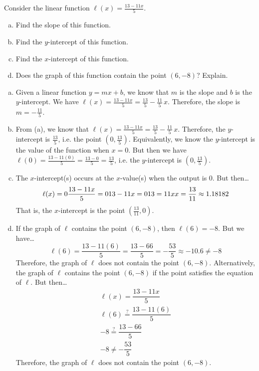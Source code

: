 \documentclass[11pt,letterpaper]{article}
\begin{document}

 Consider the linear function $\ell(x)= \frac{13 - 11x}{5}$. 
	\begin{enumerate}[(a)]
	\item Find the slope of this function.
	\item Find the $y$-intercept of this function.
	\item Find the $x$-intercept of this function.
	\item Does the graph of this function contain the point $(6, -8)$? Explain. 
	\end{enumerate} \pspace

\sol 
\begin{enumerate}[(a)]
\item Given a linear function $y= mx + b$, we know that $m$ is the slope and $b$ is the $y$-intercept. We have $\ell(x)= \frac{13 - 11x}{5}= \frac{13}{5} - \frac{11}{5}\,x$. Therefore, the slope is $m= -\frac{11}{5}$. 

\item From (a), we know that $\ell(x)= \frac{13 - 11x}{5}= \frac{13}{5} - \frac{11}{5}\,x$. Therefore, the $y$-intercept is $\frac{13}{5}$, i.e. the point $(0, \frac{13}{5})$. Equivalently, we know the $y$-intercept is the value of the function when $x= 0$. But then we have $\ell(0)= \frac{13 - 11(0)}{5}= \frac{13 - 0}{5}= \frac{13}{5}$, i.e. the $y$-intercept is $(0, \frac{13}{5})$. \pspace

\item The $x$-intercept(s) occurs at the $x$-value(s) when the output is 0. But then\dots
	\[
	\ell(x)= 0 
	\frac{13 - 11x}{5}= 0 \\
	13 - 11x= 0 \\
	13= 11x \\
	x= \frac{13}{11} \approx 1.18182
	\]
That is, the $x$-intercept is the point $(\frac{13}{11}, 0)$. \pspace

\item If the graph of $\ell$ contains the point $(6, -8)$, then $\ell(6)= -8$. But we have\dots
	\[
	\ell(6)= \dfrac{13 - 11(6)}{5}= \dfrac{13 - 66}{5}= -\dfrac{53}{5} \approx -10.6 \neq -8
	\]
Therefore, the graph of $\ell$ does not contain the point $(6, -8)$. Alternatively, the graph of $\ell$ contains the point $(6, -8)$ if the point satisfies the equation of $\ell$. But then\dots
	\[
	\begin{gathered}
	\ell(x)= \dfrac{13 - 11x}{5} \\
	\ell(6) \stackrel{?}{=} \dfrac{13 - 11(6)}{5} \\
	-8 \stackrel{?}{=} \dfrac{13 - 66}{5} \\
	-8 \neq -\dfrac{53}{5}
	\end{gathered}
	\]
Therefore, the graph of $\ell$ does not contain the point $(6, -8)$. 
\end{enumerate}
\end{document}
